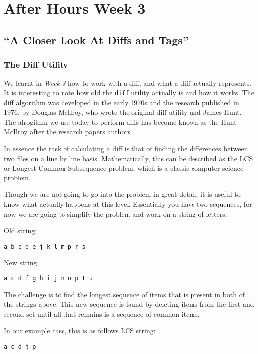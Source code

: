 \chapter{After Hours Week 3}
\section{``A Closer Look At Diffs and Tags''}
\subsection{The Diff Utility}

We learnt in \emph{Week 3} how to work with a diff, and what a diff actually represents.  It is interesting to note how old the \texttt{diff} utility actually is and how it works.  The diff algorithm was developed in the early 1970s and the research published in 1976, by Douglas McIlroy, who wrote the original diff utility and James Hunt.  The alrogithm we use today to perform diffs has become known as the Hunt-McIlroy after the research papers authors.

In essence the task of calculating a diff is that of finding the differences between two files on a line by line basis.  Mathematically, this can be described as the LCS or Longest Common Subsequence problem, which is a classic computer science problem.  

Though we are not going to go into the problem in great detail, it is useful to know what actually happens at this level.  Essentially you have two sequences, for now we are going to simplify the problem and work on a string of letters.

Old string: 
\begin{Verbatim}[frame=leftline,framerule=1mm,fontsize=\relsize{-3}]
a b c d e j k l m p r s
\end{Verbatim}

New string: 
\begin{Verbatim}[frame=leftline,framerule=1mm,fontsize=\relsize{-3}]
a c d f g h i j n o p t u
\end{Verbatim}

The challenge is to find the longest sequence of items that is present in both of the strings above.  This new sequence is found by deleting items from the first and second set until all that remains is a sequence of common items.  

In our example case, this is as follows
LCS string: 
\begin{Verbatim}[frame=leftline,framerule=1mm,fontsize=\relsize{-3}]
a c d j p
\end{Verbatim}

